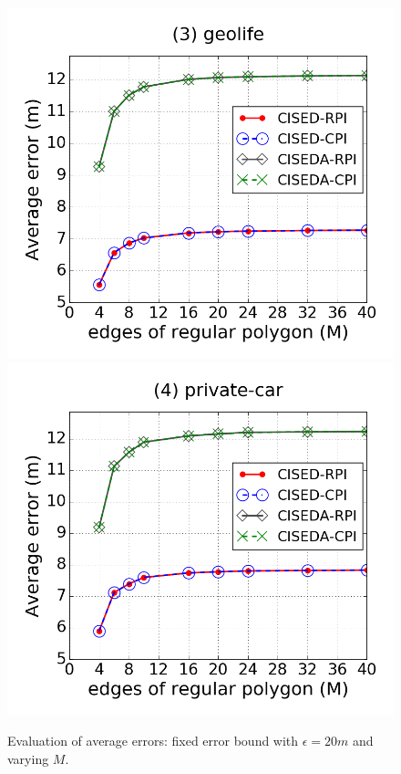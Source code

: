 \begin{figure}[tb!]
\includegraphics[scale = 0.250]{figures/Exp-M-e-20-error-geolife.png}
\includegraphics[scale = 0.250]{figures/Exp-M-e-20-error-private.png}
\vspace{-2ex}
\caption{\small Evaluation of average errors: fixed error bound with $\epsilon = 20m$ and varying $M$.}
\label{fig:m-error-e20}
\vspace{-1ex}
\end{figure}

